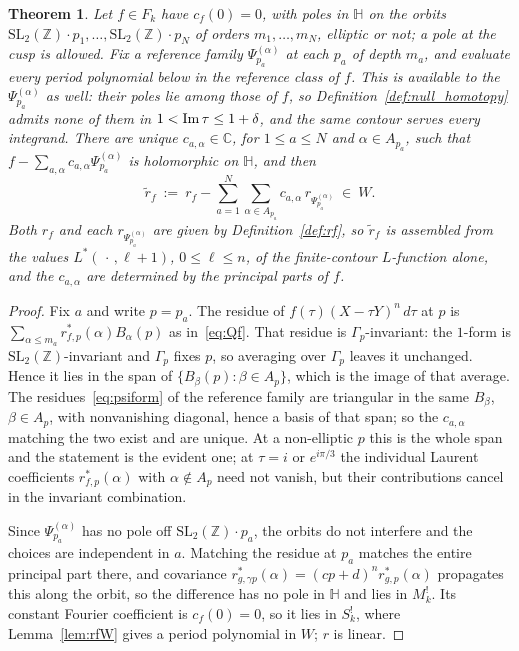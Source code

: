\documentclass[11pt]{article}
\newtheorem{theorem}{Theorem}[section]
\newcommand{\HH}{\mathbb{H}}
\newcommand{\ZZ}{\mathbb{Z}}
\newcommand{\CC}{\mathbb{C}}
\newcommand{\SLZ}{\mathrm{SL}_2(\ZZ)}
\begin{document}
\begin{theorem}\label{thm:period}
Let $f\in F_k$ have $c_f(0)=0$, with poles in $\HH$ on the orbits
$\SLZ\!\cdot\!p_1,\dots,\SLZ\!\cdot\!p_N$ of orders $m_1,\dots,m_N$, elliptic or not; a pole at the
cusp is allowed. Fix a reference family $\Psi^{(\alpha)}_{p_a}$ at each $p_a$ of depth $m_a$, and
evaluate every period polynomial below in the reference class of $f$. This is available to the
$\Psi^{(\alpha)}_{p_a}$ as well: their poles lie among those of $f$, so
Definition~\ref{def:null_homotopy} admits none of them in $1<{\rm Im}\,\tau\le1+\delta$, and the
same contour serves every integrand. There are unique $c_{a,\alpha}\in\CC$, for $1\le a\le N$ and
$\alpha\in A_{p_a}$, such that $f-\sum_{a,\alpha}c_{a,\alpha}\Psi^{(\alpha)}_{p_a}$ is holomorphic
on $\HH$, and then
\begin{equation}\label{eq:period}
\tilde r_f\ :=\ r_f-\sum_{a=1}^{N}\sum_{\alpha\in A_{p_a}}c_{a,\alpha}\,r_{\Psi^{(\alpha)}_{p_a}}
\ \in\ W .
\end{equation}
Both $r_f$ and each $r_{\Psi^{(\alpha)}_{p_a}}$ are given by Definition~\ref{def:rf}, so
$\tilde r_f$ is assembled from the values $L^*(\,\cdot\,,\ell+1)$, $0\le\ell\le n$, of the
finite-contour $L$-function alone, and the $c_{a,\alpha}$ are determined by the principal parts
of $f$.
\end{theorem}
\begin{proof}
Fix $a$ and write $p=p_a$. The residue of $f(\tau)(X-\tau Y)^n\,d\tau$ at $p$ is
$\sum_{\alpha\le m_a}r^*_{f,p}(\alpha)B_\alpha(p)$ as in~\eqref{eq:Qf}. That residue is
$\Gamma_p$-invariant: the $1$-form is $\SLZ$-invariant and $\Gamma_p$ fixes $p$, so averaging over
$\Gamma_p$ leaves it unchanged. Hence it lies in the span of $\{B_\beta(p):\beta\in A_p\}$, which is
the image of that average. The residues~\eqref{eq:psiform} of the reference family are triangular in
the same $B_\beta$, $\beta\in A_p$, with nonvanishing diagonal, hence a basis of that span; so the
$c_{a,\alpha}$ matching the two exist and are unique. At a non-elliptic $p$ this is the whole span
and the statement is the evident one; at $\tau=i$ or $e^{i\pi/3}$ the individual Laurent
coefficients $r^*_{f,p}(\alpha)$ with $\alpha\notin A_p$ need not vanish, but their contributions
cancel in the invariant combination.

Since $\Psi^{(\alpha)}_{p_a}$ has no pole off $\SLZ\!\cdot\!p_a$, the orbits do not interfere and
the choices are independent in $a$. Matching the residue at $p_a$ matches the entire principal part
there, and covariance $r^*_{g,\gamma p}(\alpha)=(cp+d)^{n}r^*_{g,p}(\alpha)$ propagates this along
the orbit, so the difference has no pole in $\HH$ and lies in $M^!_k$. Its constant Fourier
coefficient is $c_f(0)=0$, so it lies in $S^!_k$, where Lemma~\ref{lem:rfW} gives a period
polynomial in $W$; $r$ is linear.
\end{proof}
\end{document}
